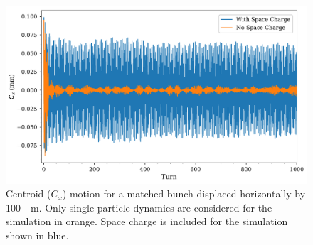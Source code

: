 \documentclass[aps,prstab,twocolumn, groupedaddress]{revtex4-1}
\begin{document}
\begin{figure}
	\includegraphics[width=\columnwidth]{sc-zc_centroid_motion_xoffset-100um.pdf}%
	\caption{\label{fig:sc_on-off} Centroid ($C_x$) motion for a matched bunch displaced 
		horizontally by \SI{100}{\mu m}. Only single particle dynamics are considered for the 
		simulation in orange. Space charge is included for the simulation shown in blue.}
\end{figure}


\end{document}
